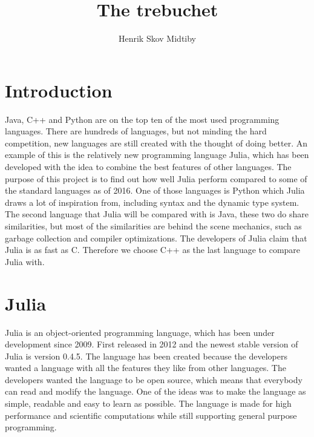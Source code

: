 \documentclass[landscape, a2]{sciposter}
\title{The trebuchet}
\author{Henrik Skov Midtiby}
\institute{Department of Physics and Chemistry,\\
           University of Southern Denmark\\}
\begin{document}
\maketitle

\begin{multicols}{3}


\section{Introduction}
Java, C++ and Python are on the top ten of the most used programming languages. There are hundreds of languages, but not minding the hard competition, new languages are still created with the thought of doing better. An example of this is the relatively new programming language Julia, which has been developed with the idea to combine the best features of other languages. The purpose of this project is to find out how well Julia perform compared to some of the standard languages as of 2016. One of those languages is Python which Julia draws a lot of inspiration from, including syntax and the dynamic type system. The second language that Julia will be compared with is Java, these two do share similarities, but most of the similarities are behind the scene mechanics, such as garbage collection and compiler optimizations. The developers of Julia claim that Julia is as fast as C. Therefore we choose C++ as the last language to compare Julia with. 
\section{Julia}
Julia is an object-oriented programming language, which has been under development since 2009. First released in 2012 and the newest stable version of Julia is version 0.4.5. The language has been created because the developers wanted a language with all the features they like from other languages. The developers wanted the language to be open source, which means that everybody can read and modify the language. One of the ideas was to make the language as simple, readable and easy to learn as possible. The language is made for high performance and scientific computations while still supporting general purpose programming.


\end{multicols}
\end{document}
